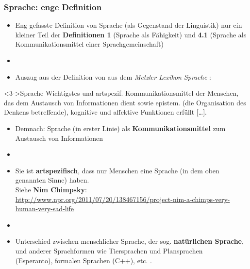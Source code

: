 
\begin{frame}

\frametitle{Sprache: enge Definition}

\begin{itemize}
	\item<1-> Eng gefasste Definition von Sprache (als Gegenstand der Linguistik) \ras nur ein kleiner Teil der \textbf{Definitionen 1} (Sprache als Fähigkeit) und \textbf{4.1} (Sprache als Kommunikationsmittel einer Sprachgemeinschaft)
	\item[]
	\item<2-> Auszug aus der Definition von  aus dem \textit{Metzler Lexikon Sprache} \citep{Glueck&Roedel16a}:
\end{itemize}
			
\begin{block}<3->{Sprache}
    	   Wichtigstes und artspezif. Kommunikationsmittel der Menschen, das dem Austausch von Informationen dient sowie epistem. (die Organisation des Denkens betreffende), kognitive und affektive Funktionen erfüllt {[}\ldots].
\end{block}
	
\end{frame}


\begin{frame}

\begin{itemize}
	\item<1-> Demnach: Sprache (in erster Linie) als \textbf{Kommunikationsmittel} zum Austausch von Informationen
	\item[]
	\item<2-> Sie ist \textbf{artspezifisch}, \dash dass nur Menschen eine Sprache (in dem
          oben genannten Sinne) haben.\\
	Siehe \textbf{Nim Chimpsky}:\\
	\url{http://www.npr.org/2011/07/20/138467156/project-nim-a-chimps-very-human-very-sad-life}
	\item[]
	\item<3-> Unterschied zwischen menschlicher Sprache, \dash der sog. \textbf{natürlichen
          Sprache}, und anderer Sprachformen wie Tiersprachen und Plansprachen\\
 (\zb Esperanto), formalen Sprachen (\zb C++), etc. \citep[vgl.][]{Thuemmel00a}.\
\end{itemize}		

\nocite{Bussmann83a-removed}
\end{frame}



